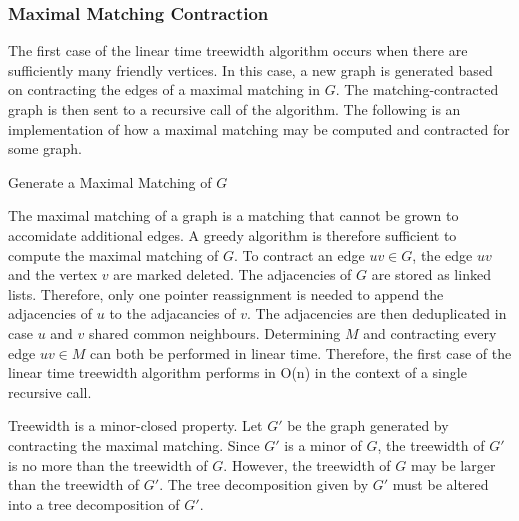 \documentclass[12pt,conference]{IEEEtran}
\theoremstyle{plain}
\begin{document}
\subsubsection{Maximal Matching Contraction}

The first case of the linear time treewidth algorithm occurs when there are sufficiently many friendly vertices. In this case, a new graph is generated based on contracting the edges of a maximal matching in $G$. The matching-contracted graph is then sent to a recursive call of the algorithm. The following is an implementation of how a maximal matching may be computed and contracted for some graph.

\begin{algorithm}[H]
  \caption{Generate a Maximal Matching of $G$}
  \label{maximal_matching}
  \begin{algorithmic}[1]
          \EndIf
        \EndFor
      \EndIf
    \EndFor
  \EndProcedure
  \end{algorithmic}
\end{algorithm}

The maximal matching of a graph is a matching that cannot be grown to accomidate additional edges. A greedy algorithm is therefore sufficient to compute the maximal matching of $G$. To contract an edge $uv \in G$, the edge $uv$ and the vertex $v$ are marked deleted. The adjacencies of $G$ are stored as linked lists. Therefore, only one pointer reassignment is needed to append the adjacencies of $u$ to the adjacancies of $v$. The adjacencies are then deduplicated in case $u$ and $v$ shared common neighbours. Determining $M$ and contracting every edge $uv \in M$ can both be performed in linear time. Therefore, the first case of the linear time treewidth algorithm performs in O(n) in the context of a single recursive call.

Treewidth is a minor-closed property. Let $G'$ be the graph generated by contracting the maximal matching. Since $G'$ is a minor of $G$, the treewidth of $G'$ is no more than the treewidth of $G$. However, the treewidth of $G$ may be larger than the treewidth of $G'$. The tree decomposition given by $G'$ must be altered into a tree decomposition of $G'$. 
\end{document}
